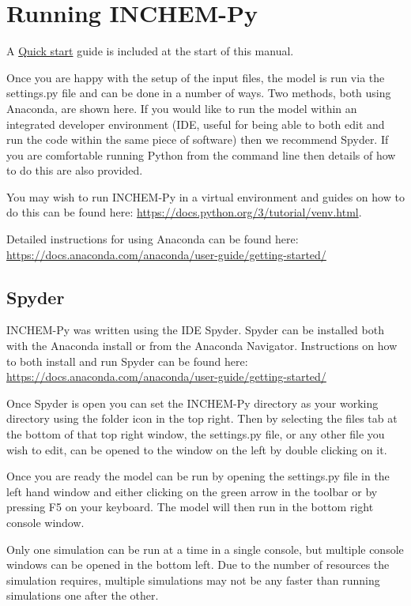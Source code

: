 \documentclass[a4paper]{refart}
\begin{document}
\newpage
\section{Running INCHEM-Py}
A \hyperref[Quick start]{Quick start} guide is included at the start of this manual. 

Once you are happy with the setup of the input files, the model is run via the settings.py file and can be done in a number of ways. Two methods, both using Anaconda, are shown here. If you would like to run the model within an integrated developer environment (IDE, useful for being able to both edit and run the code within the same piece of software) then we recommend Spyder. If you are comfortable running Python from the command line then details of how to do this are also provided.

You may wish to run INCHEM-Py in a virtual environment and guides on how to do this can be found here: \url{https://docs.python.org/3/tutorial/venv.html}.

Detailed instructions for using Anaconda can be found here: \url{https://docs.anaconda.com/anaconda/user-guide/getting-started/}

\subsection{Spyder}
INCHEM-Py was written using the IDE Spyder. Spyder can be installed both with the Anaconda install or from the Anaconda Navigator. Instructions on how to both install and run Spyder can be found here: \url{https://docs.anaconda.com/anaconda/user-guide/getting-started/}

Once Spyder is open you can set the INCHEM-Py directory as your working directory using the folder icon in the top right. Then by selecting the files tab at the bottom of that top right window, the settings.py file, or any other file you wish to edit, can be opened to the window on the left by double clicking on it.

Once you are ready the model can be run by opening the settings.py file in the left hand window and either clicking on the green arrow in the toolbar or by pressing F5 on your keyboard. The model will then run in the bottom right console window.

Only one simulation can be run at a time in a single console, but multiple console windows can be opened in the bottom left. Due to the number of resources the simulation requires, multiple simulations may not be any faster than running simulations one after the other.
\end{document}
